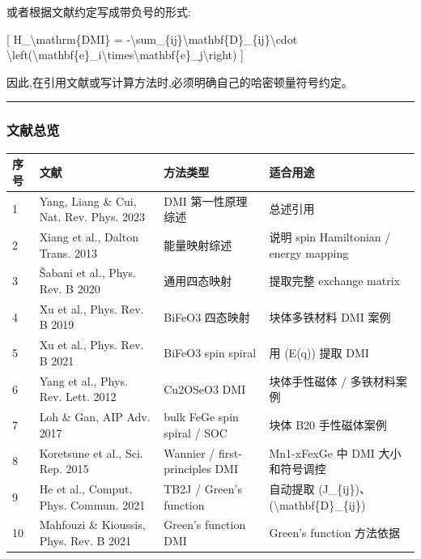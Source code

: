 \documentclass[lang=cn,scheme=chinese,color=blue,device=normal,toc=onecol,math=cm]{elegantbook}
\begin{document}
或者根据文献约定写成带负号的形式:\par


[ H\_\allowbreak{}\textbackslash{}\allowbreak{}mathrm\{DMI\} = -\textbackslash{}\allowbreak{}sum\_\allowbreak{}\{ij\}\textbackslash{}\allowbreak{}mathbf\{D\}\_\allowbreak{}\{ij\}\textbackslash{}\allowbreak{}cdot \textbackslash{}\allowbreak{}left(\textbackslash{}\allowbreak{}mathbf\{e\}\_\allowbreak{}i\textbackslash{}\allowbreak{}times\textbackslash{}\allowbreak{}mathbf\{e\}\_\allowbreak{}j\textbackslash{}\allowbreak{}right) ]\par


因此,在引用文献或写计算方法时,必须明确自己的哈密顿量符号约定。\par


\medskip\hrule\medskip


\subsubsection{文献总览}


\begin{center}\small
\begin{longtable}{@{}p{} p{} p{} p{}@{}}
\toprule
序号 & 文献 & 方法类型 & 适合用途 \\
\midrule
1 & Yang, Liang \& Cui, Nat. Rev. Phys. 2023 & DMI 第一性原理综述 & 总述引用 \\
2 & Xiang et al., Dalton Trans. 2013 & 能量映射综述 & 说明 spin Hamiltonian /\allowbreak{} energy mapping \\
3 & Šabani et al., Phys. Rev. B 2020 & 通用四态映射 & 提取完整 exchange matrix \\
4 & Xu et al., Phys. Rev. B 2019 & BiFeO3 四态映射 & 块体多铁材料 DMI 案例 \\
5 & Xu et al., Phys. Rev. B 2021 & BiFeO3 spin spiral & 用 (E(q)) 提取 DMI \\
6 & Yang et al., Phys. Rev. Lett. 2012 & Cu2OSeO3 DMI & 块体手性磁体 /\allowbreak{} 多铁材料案例 \\
7 & Loh \& Gan, AIP Adv. 2017 & bulk FeGe spin spiral /\allowbreak{} SOC & 块体 B20 手性磁体案例 \\
8 & Koretsune et al., Sci. Rep. 2015 & Wannier /\allowbreak{} first-principles DMI & Mn1-xFexGe 中 DMI 大小和符号调控 \\
9 & He et al., Comput. Phys. Commun. 2021 & TB2J /\allowbreak{} Green’s function & 自动提取 (J\_\allowbreak{}\{ij\})、(\textbackslash{}\allowbreak{}mathbf\{D\}\_\allowbreak{}\{ij\}) \\
10 & Mahfouzi \& Kioussis, Phys. Rev. B 2021 & Green’s function DMI & Green’s function 方法依据 \\
\bottomrule
\end{longtable}
\end{center}
\end{document}
